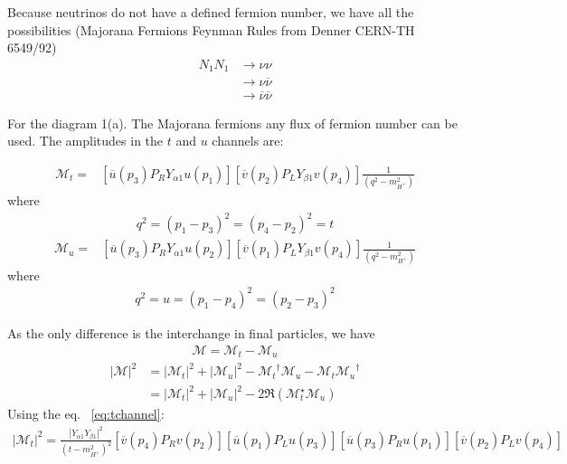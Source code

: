 \documentclass[12pt,letterpaper]{article}
\begin{document}

Because neutrinos do not have a defined fermion number, we have all the possibilities (Majorana Fermions Feynman Rules from Denner CERN-TH 6549/92)
\begin{align}
  N_1 N_1 & \to \nu \nu \nonumber\\
   & \to \nu \overline{\nu} \nonumber\\
   & \to \overline{\nu} \overline{\nu}
\end{align}

For the diagram 1(a). The Majorana fermions any flux of fermion number can be used. The amplitudes in the $t$ and $u$ channels are:

\begin{align}
\label{eq:tchannel}
  \mathcal{M}_t=& \left[ \overline{u}(p_3) P_R Y_{\alpha 1}u(p_1) \right]
\left[ \overline{v}(p_2) P_L Y_{\beta 1}v(p_4) \right]
\frac{1}{(q^2-m_{H^+}^2)}
\end{align}
where
\begin{align}
  q^2=(p_1-p_3)^2=(p_4-p_2)^2=t
\end{align}
\begin{align}
\label{eq:uchannel}
  \mathcal{M}_u=& \left[ \overline{u}(p_3) P_R Y_{\alpha 1}u(p_2) \right]
\left[ \overline{v}(p_1) P_L Y_{\beta 1}v(p_4) \right]
\frac{1}{(q^2-m_{H^+}^2)}
\end{align}
where
\begin{align}
  q^2=u=(p_1-p_4)^2=(p_2-p_3)^2
\end{align}

As the only difference is the interchange in final particles, we have
\begin{align*}
  \mathcal{M}=\mathcal{M}_t-\mathcal{M}_u
\end{align*}
\begin{align}
\label{eq:amplitude}
  |\mathcal{M}|^2 &= |\mathcal{M}_t|^2 + |\mathcal{M}_u|^2 - {\mathcal{M}_t}^{\dagger}\mathcal{M}_u -\mathcal{M}_t{\mathcal{M}_u}^{\dagger}\nonumber\\
                & = |\mathcal{M}_t|^2 + |\mathcal{M}_u|^2 - 2\Re(\mathcal{M}_t^{\star}\mathcal{M}_u)
\end{align}
Using the eq. ~\eqref{eq:tchannel}:
\begin{align*}
  |\mathcal{M}_{t}|^2=\frac{|Y_{\alpha 1}Y_{\beta 1}|^2}{(t-m_{H^+}^2)^2}
  \left[ \overline{v}(p_4)P_R v(p_2) \right]
  \left[ \overline{u}(p_1)P_L u(p_3) \right]
 \left[ \overline{u}(p_3)P_R u(p_1) \right]
 \left[ \overline{v}(p_2)P_L v(p_4) \right]
\end{align*}
\end{document}
